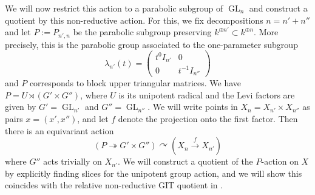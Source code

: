 \documentclass[a4paper,12pt]{article}
\theoremstyle{definition}
\theoremstyle{plain}
\theoremstyle{remark}
\DeclareMathOperator{\GL}{GL}
\begin{document}
We will now restrict this action to a parabolic subgroup of $\GL_n$ and construct a quotient by this non-reductive action. For this, we fix decompositions $n = n' + n''$ and let $P := P_{n',n}$ be the parabolic subgroup preserving $k^{\oplus n'} \subset k^{\oplus n}$. More precisely, this is the parabolic group associated to the one-parameter subgroup
\[ \lambda_{n'}(t) = \left( \begin{array}{cc} t^0 I_{n'} & 0 \\ 0 & t^{-1}I_{n''} \end{array} \right)\]
and $P$ corresponds to block upper triangular matrices. We have $P = U \rtimes (G' \times G'')$, where $U$ is its unipotent radical and the Levi factors are given by $G' = \GL_{n'}$ and $G''= \GL_{n''}$. We will write points in $X_n = X_{n'} \times X_{n''}$ as pairs $x = (x',x'')$, and let $f$ denote the projection onto the first factor. Then there is an equivariant action
\begin{equation}\label{eqn:toy example equivariant action set up}
(P \twoheadrightarrow G' \times G'') \curvearrowright (X_{n} \stackrel{f}{\rightarrow} X_{n'})
\end{equation}
where $G''$ acts trivially on $X_{n'}$. We will construct a quotient of the $P$-action on $X$ by explicitly finding slices for the unipotent group action, and we will show this coincides with the relative non-reductive GIT quotient in \cite{HHJ}.
\end{document}
